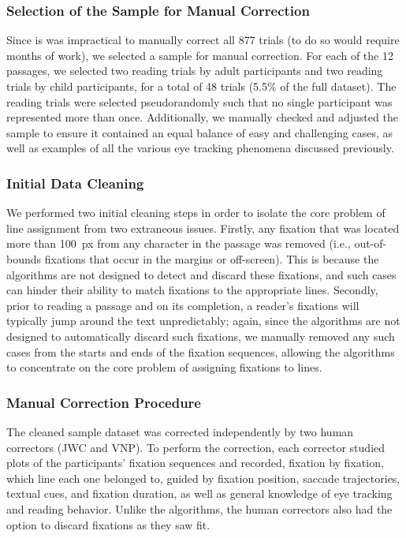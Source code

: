 \documentclass[doc,biblatex]{apa7}
\begin{document}
\subsubsection{Selection of the Sample for Manual Correction}

Since is was impractical to manually correct all 877 trials (to do so would require months of work), we selected a sample for manual correction. For each of the 12 passages, we selected two reading trials by adult participants and two reading trials by child participants, for a total of 48 trials (5.5\% of the full dataset). The reading trials were selected pseudorandomly such that no single participant was represented more than once. Additionally, we manually checked and adjusted the sample to ensure it contained an equal balance of easy and challenging cases, as well as examples of all the various eye tracking phenomena discussed previously.

\subsubsection{Initial Data Cleaning}

We performed two initial cleaning steps in order to isolate the core problem of line assignment from two extraneous issues. Firstly, any fixation that was located more than 100~px from any character in the passage was removed (i.e., out-of-bounds fixations that occur in the margins or off-screen). This is because the algorithms are not designed to detect and discard these fixations, and such cases can hinder their ability to match fixations to the appropriate lines. Secondly, prior to reading a passage and on its completion, a reader's fixations will typically jump around the text unpredictably; again, since the algorithms are not designed to automatically discard such fixations, we manually removed any such cases from the starts and ends of the fixation sequences, allowing the algorithms to concentrate on the core problem of assigning fixations to lines.

\subsubsection{Manual Correction Procedure}

The cleaned sample dataset was corrected independently by two human correctors (JWC and VNP). To perform the correction, each corrector studied plots of the participants' fixation sequences and recorded, fixation by fixation, which line each one belonged to, guided by fixation position, saccade trajectories, textual cues, and fixation duration, as well as general knowledge of eye tracking and reading behavior. Unlike the algorithms, the human correctors also had the option to discard fixations as they saw fit.
\end{document}
